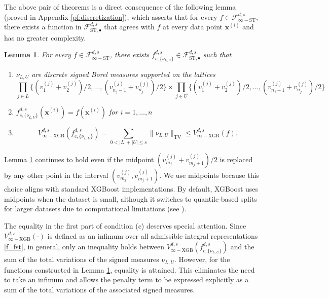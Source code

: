 \documentclass[10pt]{article}
\newtheorem{lemma}{Lemma}
\newcommand{\fstmid}{{\mathcal{F}^{d, s}_{\text{ST}, \bullet}}}
\newcommand{\fstinf}{{\mathcal{F}^{d, s}_{\infty-\text{ST}}}}
\newcommand{\vinfxgb}{{V^{d, s}_{\infty-\text{XGB}}}}
\newcommand{\fcnu}{{f^{d, s}_{c, \{\nu_{L, U}\}}}}
\newcommand{\xbf}{{\mathbf{x}}}
\begin{document}
The above pair of theorems is a direct consequence of the following
lemma (proved in Appendix \ref{pf:discretization}), 
which asserts that for every $f \in \fstinf$, there exists a 
function in $\fstmid$ that agrees with $f$ at every data point 
$\xbf^{(i)}$ and has no greater complexity.
\begin{lemma}\label{lem:discretization}
    For every $f \in \fstinf$, there exists 
    $\fcnu \in \fstmid$ such that
    \begin{enumerate}[label = (\alph*)]
    \item $\nu_{L, U}$ are discrete signed Borel measures supported 
    on the lattices
    \begin{equation}\label{lattice}
        \prod_{j \in L} \Big\{ (v^{(j)}_1 + v^{(j)}_2)/2, \dots, 
        (v^{(j)}_{n_j - 1} + v^{(j)}_{n_j})/2 \Big\} \times 
        \prod_{j \in U} \Big\{ (v^{(j)}_1 + v^{(j)}_2)/2, \dots, 
        (v^{(j)}_{n_j - 1} + v^{(j)}_{n_j})/2 \Big\}
    \end{equation}
    \item $\fcnu(\xbf^{(i)}) = f(\xbf^{(i)})$ for 
    $i = 1, \dots, n$
    \item 
    \begin{equation*}
        \vinfxgb(\fcnu) 
        = \sum_{0 < |L| + |U| \le s} \|\nu_{L, U}\|_{\text{TV}}
        \le \vinfxgb(f).
    \end{equation*}
    \end{enumerate}
\end{lemma}

Lemma \ref{lem:discretization} continues to hold even if the
midpoint $(v^{(j)}_{m_j} + v^{(j)}_{m_j + 1})/2$ is replaced by 
any other point in the interval $(v^{(j)}_{m_j}, v^{(j)}_{m_j + 1})$. 
We use midpoints because this choice aligns with standard XGBoost 
implementations. By default, XGBoost uses midpoints when the dataset 
is small, although it switches to quantile-based splits for larger 
datasets due to computational limitations 
(see \cite{xgboost_params_docs}).

The equality in the first part of condition (c) deserves special
attention. Since $\vinfxgb(\cdot)$ is defined as an infimum over
all admissible integral representations \eqref{f_fst}, in general, 
only an inequality holds between $\vinfxgb(\fcnu)$ and the sum of 
the total variations of the signed measures $\nu_{L, U}$. However, 
for the functions constructed in Lemma \ref{lem:discretization}, 
equality is attained. This eliminates the need to take an infimum 
and allows the penalty term to be expressed explicitly as a sum 
of the total variations of the associated signed measures.
\end{document}
